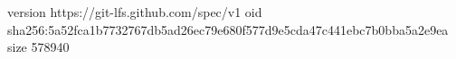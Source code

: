 version https://git-lfs.github.com/spec/v1
oid sha256:5a52fca1b7732767db5ad26ec79e680f577d9e5cda47c441ebc7b0bba5a2e9ea
size 578940
